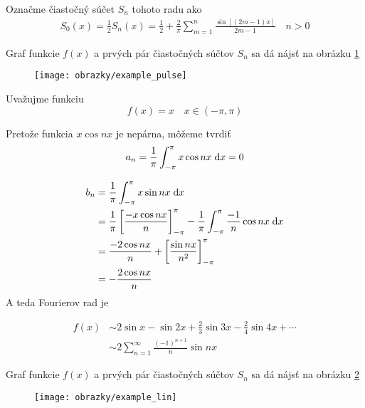 \begin{priklad}
    Označme čiastočný súčet $S_n$ tohoto radu ako 
    \begin{align}
        S_0(x) = \frac{1}{2}
        S_n(x) = \frac{1}{2} + \frac{2}{\pi} \sum_{m=1}^{n}
                \frac{\sin\left[ (2m-1) x\right]}{2m-1} \quad n>0
    \end{align}
    
    Graf funkcie $f(x)$ a prvých pár čiastočných súčtov $S_n$ sa dá
    nájsť na obrázku \ref{fig:example_pulse}

    \begin{figure}[htp]
        \centering
        \texttt{[image: obrazky/example\_pulse]}
        \caption{}
        \label{fig:example_pulse}
    \end{figure}    
\end{priklad}

\begin{priklad}
   Uvažujme funkciu 
   \begin{equation}
        f(x) = x \quad x \in(-\pi,\pi)
   \end{equation}

    Pretože funkcia $x \cos nx$ je nepárna, môžeme tvrdiť
   \begin{equation}
        a_n = \frac{1}{\pi} \int_{-\pi}^{\pi} x \cos nx \; \mathrm{d} x =0
   \end{equation}

   \begin{align}
        b_n &= \frac{1}{\pi} \int_{-\pi}^{\pi} x \sin nx \; \mathrm{d} x \\
        &= \frac{1}{\pi} \left[
            \frac{- x \cos nx}{n}
            \right]_{-\pi}^\pi -
            \frac{1}{\pi} \int_{-\pi}^{\pi} \frac{-1}{n} \cos nx \; \mathrm{d} x  \\
        &=
        \frac{-2 \cos nx}{n} + 
            \left[
                \frac{\sin nx}{n^2}
            \right]_{-\pi}^{\pi} \\
        &= -\frac{2 \cos nx}{n}
   \end{align}
   A teda Fourierov rad je
   
   \begin{align}
   f(x) &\sim 2 \sin x - \sin 2x + \frac{2}{3} \sin 3x - \frac{2}{4}
    \sin 4x + \cdots \\
     &\sim 2\sum_{n=1}^{\infty} \frac{(-1)^{n+1}}{n} \sin nx
    \end{align}
    
    Graf funkcie $f(x)$ a prvých pár čiastočných súčtov $S_n$ sa dá
    nájsť na obrázku \ref{fig:example_lin}

    \begin{figure}[htp]
        \centering
        \texttt{[image: obrazky/example\_lin]}
        \caption{}
        \label{fig:example_lin}
    \end{figure}    

\end{priklad}

